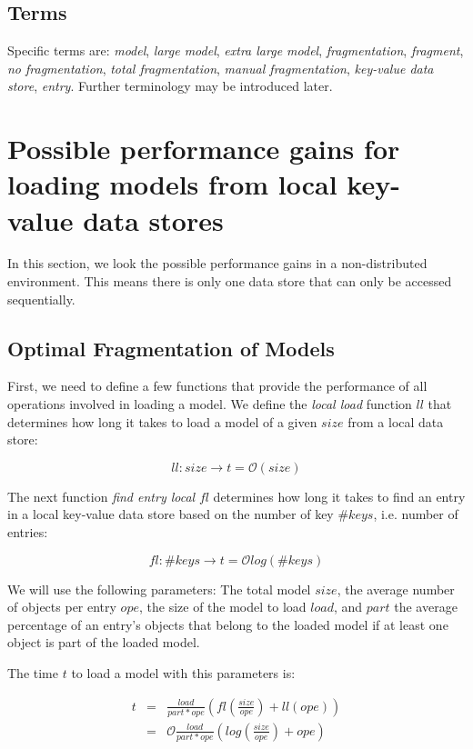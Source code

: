 \subsection{Terms}

Specific terms are: \emph{model}, \emph{large model}, \emph{extra large model}, \emph{fragmentation}, \emph{fragment}, \emph{no fragmentation}, \emph{total fragmentation}, \emph{manual fragmentation}, \emph{key-value data store}, \emph{entry}. Further terminology may be introduced later.

\section{Possible performance gains for loading models from local key-value data stores}

In this section, we look the possible performance gains in a non-distributed environment. This means there is only one data store that can only be accessed sequentially. 

\subsection{Optimal Fragmentation of Models}

First, we need to define a few functions that provide the performance of all operations involved in loading a model. We define the \emph{local load} function $ll$ that determines how long it takes to load a model of a given $size$  from a local data store:

$$ll:size\rightarrow t=\mathcal{O}\left(size\right)$$

The next function \emph{find entry local} $fl$ determines how long it takes to find an entry in a local key-value data store based on the number of key $\#keys$, i.e. number of entries:

$$fl:\#keys\rightarrow t=\mathcal{O}log(\#keys)$$

We will use the following parameters: The total model $size$, the average number of objects per entry $ope$, the size of the model to load $load$, and $part$ the average percentage of an entry's objects that belong to the loaded model if at least one object is part of the loaded model.

The time $t$ to load a model with this parameters is:

\begin{eqnarray*}
t&=&\frac{load}{part*ope}\left(fl(\frac{size}{ope}) + ll(ope)\right)\\
&=&\mathcal{O}\frac{load}{part*ope}\left(log(\frac{size}{ope})+ope\right)\\
\end{eqnarray*}

